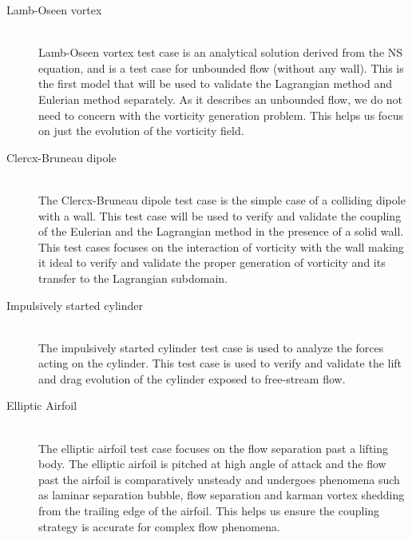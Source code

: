 	\begin{description}
	\item[Lamb-Oseen vortex] \cite{Lamb1993} \cite{Tryggeson2007} \hfill\\
	Lamb-Oseen vortex test case is an analytical solution derived from the NS equation, and is a test case for unbounded flow (without any wall). This is the first model that will be used to validate the Lagrangian method and Eulerian method separately. As it describes an unbounded flow, we do not need to concern with the vorticity generation problem. This helps us focus on just the evolution of the vorticity field.
	\item[Clercx-Bruneau dipole] \cite{Clercx2006a}\hfill\\
	The Clercx-Bruneau dipole test case is the simple case of a colliding dipole with a wall. This test case will be used to verify and validate the coupling of the Eulerian and the Lagrangian method in the presence of a solid wall. This test cases focuses on the interaction of vorticity with the wall making it ideal to verify and validate the proper generation of vorticity and its transfer to the Lagrangian subdomain.
	\item[Impulsively started cylinder] \cite{Koumoutsakos1995a} \cite{Chang1991} \cite{Braza1986} \cite{Lecointe1984}\hfill\\
	The impulsively started cylinder test case is used to analyze the forces acting on the cylinder. This test case is used to verify and validate the lift and drag evolution of the cylinder exposed to free-stream flow.
	\item[Elliptic Airfoil] \cite{Nair1997a}\hfill\\
	The elliptic airfoil test case focuses on the flow separation past a lifting body. The elliptic airfoil is pitched at high angle of attack and the flow past the airfoil is comparatively unsteady and undergoes phenomena such as laminar separation bubble, flow separation and karman vortex shedding from the trailing edge of the airfoil. This helps us ensure the coupling strategy is accurate for complex flow phenomena.
	\end{description}

